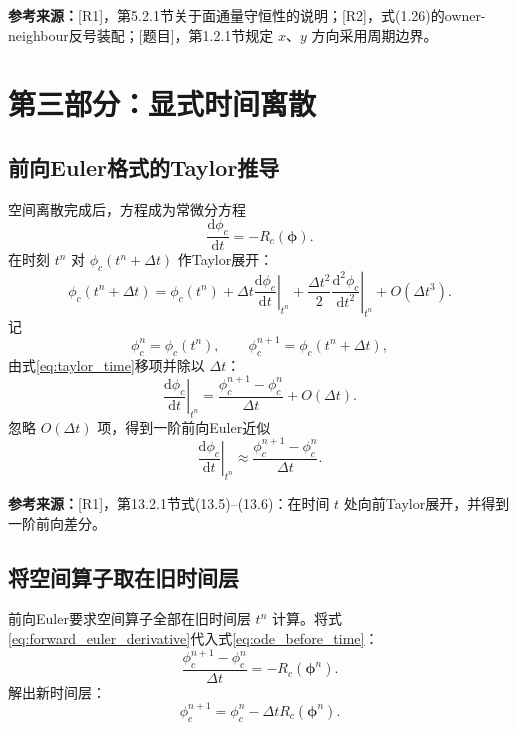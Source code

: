 \documentclass[UTF8,12pt,a4paper]{ctexart}
\numberwithin{equation}{section}
\newcommand{\Rone}{\textnormal{[R1]}}
\newcommand{\Rtwo}{\textnormal{[R2]}}
\newcommand{\Task}{\textnormal{[题目]}}
\newcommand{\source}[1]{%
  \par\smallskip
  \noindent\colorbox{sourcebg}{%
    \parbox{0.955\linewidth}{\footnotesize\color{sourcegray}\textbf{参考来源：}#1}%
  }
  \par\smallskip
}
\newcommand{\phiv}{\bm\phi}
\begin{document}
\source{\Rone，第5.2.1节关于面通量守恒性的说明；\Rtwo，式(1.26)的owner-neighbour反号装配；\Task，第1.2.1节规定 $x$、$y$ 方向采用周期边界。}

\newpage
\section{第三部分：显式时间离散}

\subsection{前向Euler格式的Taylor推导}

空间离散完成后，方程成为常微分方程
\begin{equation}
  \frac{\mathrm d\phi_c}{\mathrm dt}
  =-R_c(\phiv).
  \label{eq:ode_before_time}
\end{equation}
在时刻 $t^n$ 对 $\phi_c(t^n+\Delta t)$ 作Taylor展开：
\begin{equation}
  \phi_c(t^n+\Delta t)
  =\phi_c(t^n)
  +\Delta t\left.\frac{\mathrm d\phi_c}{\mathrm dt}\right|_{t^n}
  +\frac{\Delta t^2}{2}
  \left.\frac{\mathrm d^2\phi_c}{\mathrm dt^2}\right|_{t^n}
  +O(\Delta t^3).
  \label{eq:taylor_time}
\end{equation}
记
\begin{equation}
  \phi_c^n=\phi_c(t^n),
  \qquad
  \phi_c^{n+1}=\phi_c(t^n+\Delta t),
  \label{eq:time_notation}
\end{equation}
由式\eqref{eq:taylor_time}移项并除以 $\Delta t$：
\begin{equation}
  \left.\frac{\mathrm d\phi_c}{\mathrm dt}\right|_{t^n}
  =\frac{\phi_c^{n+1}-\phi_c^n}{\Delta t}+O(\Delta t).
  \label{eq:forward_difference}
\end{equation}
忽略 $O(\Delta t)$ 项，得到一阶前向Euler近似
\begin{equation}
  \left.\frac{\mathrm d\phi_c}{\mathrm dt}\right|_{t^n}
  \approx\frac{\phi_c^{n+1}-\phi_c^n}{\Delta t}.
  \label{eq:forward_euler_derivative}
\end{equation}

\source{\Rone，第13.2.1节式(13.5)--(13.6)：在时间 $t$ 处向前Taylor展开，并得到一阶前向差分。}

\subsection{将空间算子取在旧时间层}

前向Euler要求空间算子全部在旧时间层 $t^n$ 计算。将式\eqref{eq:forward_euler_derivative}代入式\eqref{eq:ode_before_time}：
\begin{equation}
  \frac{\phi_c^{n+1}-\phi_c^n}{\Delta t}
  =-R_c(\phiv^n).
  \label{eq:euler_residual}
\end{equation}
解出新时间层：
\begin{equation}
  \boxed{
  \phi_c^{n+1}
  =\phi_c^n-\Delta t R_c(\phiv^n)
  }.
  \label{eq:euler_update_residual}
\end{equation}
\end{document}
